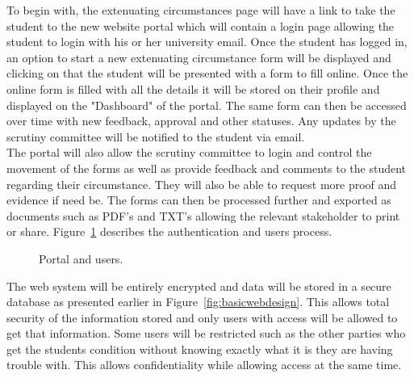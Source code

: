 \documentclass[../main.tex]{subfiles}
\begin{document}
\raggedright

To begin with, the extenuating circumstances page\cite{ecfuni} will have a link to take the student to the new website portal which will contain a login page allowing the student to login with his or her university email. Once the student has logged in, an option to start a new extenuating circumstance form will be displayed and clicking on that the student will be presented with a form to fill online. Once the online form is filled with all the details it will be stored on their profile and displayed on the "Dashboard" of the portal. The same form can then be accessed over time with new feedback, approval and other statuses. Any updates by the scrutiny committee will be notified to the student via email. \\[2mm]


The portal will also allow the scrutiny committee to login and control the movement of the forms as well as provide feedback and comments to the student regarding their circumstance. They will also be able to request more proof and evidence if need be. The forms can then be processed further and exported as documents such as PDF's and TXT's allowing the relevant stakeholder to print or share. Figure~\ref{fig:portal1} describes the authentication and users process.

	\begin{figure}[H]
        \caption{\label{fig:portal1} Portal and users.}
      \end{figure}

The web system will be entirely encrypted and data will be stored in a secure database as presented earlier in Figure~\ref{fig:basicwebdesign}. This allows total security of the information stored and only users with access will be allowed to get that information. Some users will be restricted such as the other parties who get the students condition without knowing exactly what it is they are having trouble with. This allows confidentiality while allowing access at the same time. 
\end{document}
